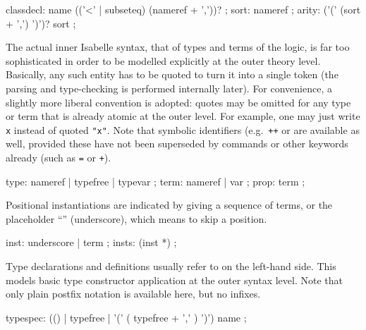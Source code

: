 \begin{isabellebody}
\begin{isamarkuptext}
  \begin{rail}
    classdecl: name (('<' | subseteq) (nameref + ','))?
    ;
    sort: nameref
    ;
    arity: ('(' (sort + ',') ')')? sort
    ;
  \end{rail}%
\end{isamarkuptext}%
\isamarkuptrue%
%
\isamarkuptrue%
%
\begin{isamarkuptext}%
The actual inner Isabelle syntax, that of types and terms of the
  logic, is far too sophisticated in order to be modelled explicitly
  at the outer theory level.  Basically, any such entity has to be
  quoted to turn it into a single token (the parsing and type-checking
  is performed internally later).  For convenience, a slightly more
  liberal convention is adopted: quotes may be omitted for any type or
  term that is already atomic at the outer level.  For example, one
  may just write \verb|x| instead of quoted \verb|"x"|.
  Note that symbolic identifiers (e.g.\ \verb|++| or \isa{{\isachardoublequote}{\isasymforall}{\isachardoublequote}} are available as well, provided these have not been superseded
  by commands or other keywords already (such as \verb|=| or
  \verb|+|).

  \begin{rail}
    type: nameref | typefree | typevar
    ;
    term: nameref | var
    ;
    prop: term
    ;
  \end{rail}

  Positional instantiations are indicated by giving a sequence of
  terms, or the placeholder ``\isa{{\isacharunderscore}}'' (underscore), which means to
  skip a position.

  \begin{rail}
    inst: underscore | term
    ;
    insts: (inst *)
    ;
  \end{rail}

  Type declarations and definitions usually refer to
   on the left-hand side.  This models basic
  type constructor application at the outer syntax level.  Note that
  only plain postfix notation is available here, but no infixes.

  \begin{rail}
    typespec: (() | typefree | '(' ( typefree + ',' ) ')') name
    ;


\end{rail}
\end{isamarkuptext}
\end{isabellebody}
